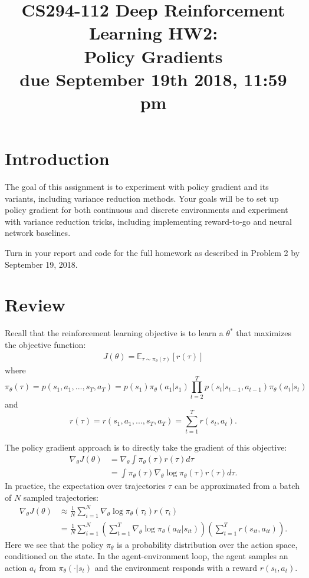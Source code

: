\documentclass[12pt]{article}
\title{CS294-112 Deep Reinforcement Learning HW2: \\ Policy Gradients\\
\textbf{due September 19th 2018, 11:59 pm}}
\author{
}
\date{}
\begin{document}
\maketitle

\section{Introduction}
The goal of this assignment is to experiment with policy gradient and its variants, including variance reduction methods. Your goals will be to set up policy gradient for both continuous and discrete environments and experiment with variance reduction tricks, including implementing reward-to-go and neural network baselines.

Turn in your report and code for the full homework as described in Problem 2 by September 19, 2018.

\section{Review}
Recall that the reinforcement learning objective is to learn a $\theta^*$ that maximizes the objective function:
\begin{align} \label{objective}
J(\theta) = \mathbb{E}_{\tau \sim \pi_\theta(\tau)} \left[r(\tau)\right]
\end{align}
where 
$$\pi_\theta(\tau) = p(s_1, a_1, ..., s_T, a_T) = p(s_1)\pi_\theta(a_1|s_1) \prod_{t=2}^T p(s_t | s_{t-1}, a_{t-1}) \pi_\theta(a_t | s_t)$$
and 
$$r(\tau) = r(s_1, a_1, ..., s_T, a_T) = \sum_{t=1}^T r(s_t, a_t).$$

The policy gradient approach is to directly take the gradient of this objective:
\begin{align}
\nabla_\theta J(\theta) &= \nabla_\theta \int \pi_\theta(\tau) r(\tau) d\tau \label{policygradientintegral} \\ 
&= \int \pi_\theta(\tau) \nabla_\theta \log \pi_\theta(\tau) r(\tau) d\tau. \label{scorefunctionpg}
\end{align}
In practice, the expectation over trajectories $\tau$ can be approximated from a batch of $N$ sampled trajectories:
\begin{align}
\nabla_\theta J(\theta) &\approx \frac{1}{N} \sum_{i=1}^N \nabla_\theta \log \pi_\theta(\tau_i) r(\tau_i) \\
&= \frac{1}{N} \sum_{i=1}^N \left(\sum_{t=1}^T \nabla_\theta \log \pi_\theta(a_{it} | s_{it})\right)\left(\sum_{t=1}^T r(s_{it}, a_{it})\right). \label{estimatedscorefunctionpg}
\end{align}
Here we see that the policy $\pi_\theta$ is a probability distribution over the action space, conditioned on the state. In the agent-environment loop, the agent samples an action $a_t$ from $\pi_\theta(\cdot | s_t)$ and the environment responds with a reward $r(s_t, a_t)$.
\end{document}
